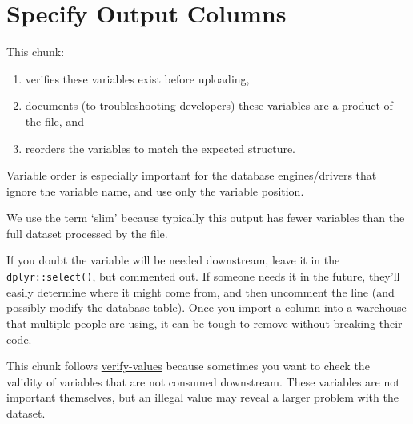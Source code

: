 \documentclass[
]{book}
\newenvironment{Shaded}{\begin{snugshade}}{\end{snugshade}}
\newcommand{\CharTok}[1]{\textcolor[rgb]{0.31,0.60,0.02}{#1}}
\newcommand{\DataTypeTok}[1]{\textcolor[rgb]{0.13,0.29,0.53}{#1}}
\newcommand{\KeywordTok}[1]{\textcolor[rgb]{0.13,0.29,0.53}{\textbf{#1}}}
\newcommand{\NormalTok}[1]{#1}
\newcommand{\OperatorTok}[1]{\textcolor[rgb]{0.81,0.36,0.00}{\textbf{#1}}}
\newcommand{\StringTok}[1]{\textcolor[rgb]{0.31,0.60,0.02}{#1}}
\providecommand{\tightlist}{%
  \setlength{\itemsep}{0pt}\setlength{\parskip}{0pt}}
\begin{document}
\begin{Shaded}
\end{Shaded}

\hypertarget{chunk-specify-columns}{%
\section{Specify Output Columns}\label{chunk-specify-columns}}

This chunk:

\begin{enumerate}
\def\labelenumi{\arabic{enumi}.}
\tightlist
\item
  verifies these variables exist before uploading,
\item
  documents (to troubleshooting developers) these variables are a product of the file, and
\item
  reorders the variables to match the expected structure.
\end{enumerate}

Variable order is especially important for the database engines/drivers that ignore the variable name, and use only the variable position.

We use the term `slim' because typically this output has fewer variables than the full dataset processed by the file.

If you doubt the variable will be needed downstream, leave it in the \texttt{dplyr::select()}, but commented out. If someone needs it in the future, they'll easily determine where it might come from, and then uncomment the line (and possibly modify the database table). Once you import a column into a warehouse that multiple people are using, it can be tough to remove without breaking their code.

This chunk follows \protect\hyperlink{chunk-verify-values}{verify-values} because sometimes you want to check the validity of variables that are not consumed downstream. These variables are not important themselves, but an illegal value may reveal a larger problem with the dataset.
\end{document}
